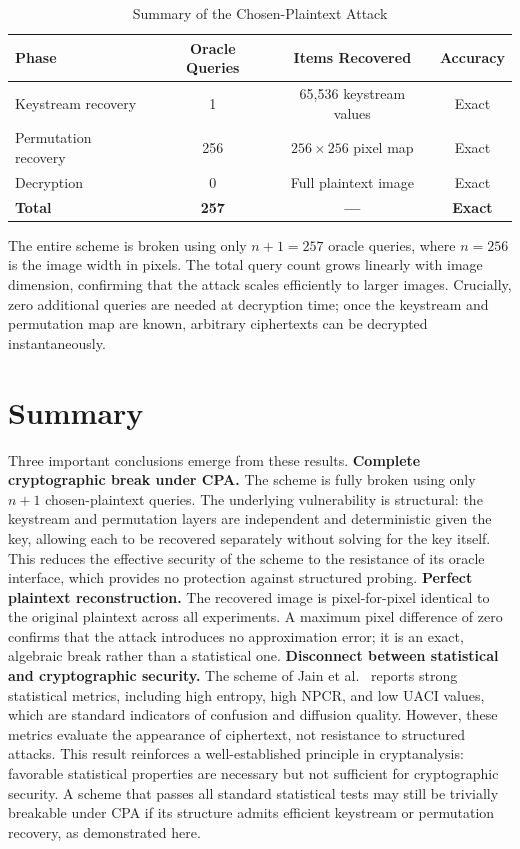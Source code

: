 \begin{table}[t]
\centering
\caption{Summary of the Chosen-Plaintext Attack}
\label{tab:attack_summary}
\begin{tabular}{@{}lccc@{}}
\toprule
\textbf{Phase} & \textbf{Oracle Queries} & \textbf{Items Recovered} & \textbf{Accuracy} \\
\midrule
Keystream recovery  & 1   & 65,536 keystream values     & Exact \\
Permutation recovery & 256 & $256 \times 256$ pixel map  & Exact \\
Decryption          & 0   & Full plaintext image         & Exact \\
\midrule
\textbf{Total}      & \textbf{257} & \textbf{---}        & \textbf{Exact} \\
\bottomrule
\end{tabular}
\end{table}

The entire scheme is broken using only $n + 1 = 257$ oracle queries, where $n = 256$ is the image width in pixels. The total query count grows linearly with image dimension, confirming that the attack scales efficiently to larger images. Crucially, zero additional queries are needed at decryption time; once the keystream and permutation map are known, arbitrary ciphertexts can be decrypted instantaneously.

\section{Summary}

Three important conclusions emerge from these results. \textbf{Complete cryptographic break under CPA.} The scheme is fully broken using only $n + 1$ chosen-plaintext queries. The underlying vulnerability is structural: the keystream and permutation layers are independent and deterministic given the key, allowing each to be recovered separately without solving for the key itself. This reduces the effective security of the scheme to the resistance of its oracle interface, which provides no protection against structured probing. \textbf{Perfect plaintext reconstruction.} The recovered image is pixel-for-pixel identical to the original plaintext across all experiments. A maximum pixel difference of zero confirms that the attack introduces no approximation error; it is an exact, algebraic break rather than a statistical one. \textbf{Disconnect between statistical and cryptographic security.} The scheme of Jain et al.~\cite{jain2021medical} reports strong statistical metrics, including high entropy, high NPCR, and low UACI values, which are standard indicators of confusion and diffusion quality. However, these metrics evaluate the appearance of ciphertext, not resistance to structured attacks. This result reinforces a well-established principle in cryptanalysis: favorable statistical properties are necessary but not sufficient for cryptographic security. A scheme that passes all standard statistical tests may still be trivially breakable under CPA if its structure admits efficient keystream or permutation recovery, as demonstrated here.
